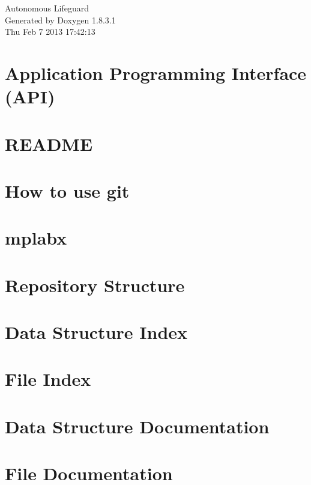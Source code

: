 \documentclass{book}
\begin{document}
\hypersetup{pageanchor=false,citecolor=blue}
\begin{titlepage}
\vspace*{7cm}
\begin{center}
{\Large Autonomous Lifeguard }\\
\vspace*{1cm}
{\large Generated by Doxygen 1.8.3.1}\\
\vspace*{0.5cm}
{\small Thu Feb 7 2013 17:42:13}\\
\end{center}
\end{titlepage}
\clearemptydoublepage
{}
\tableofcontents
\clearemptydoublepage
{}
\hypersetup{pageanchor=true,citecolor=blue}
\chapter{Application Programming Interface (A\-P\-I)}
\label{index}\hypertarget{index}{}
\chapter{R\-E\-A\-D\-M\-E}
\label{md_README}
\hypertarget{md_README}{}

\chapter{How to use git}
\label{md_github}
\hypertarget{md_github}{}

\chapter{mplabx}
\label{md_mplabx}
\hypertarget{md_mplabx}{}

\chapter{Repository Structure}
\label{md_structure}
\hypertarget{md_structure}{}

\chapter{Data Structure Index}

\chapter{File Index}

\chapter{Data Structure Documentation}

\chapter{File Documentation}











\printindex
\end{document}
